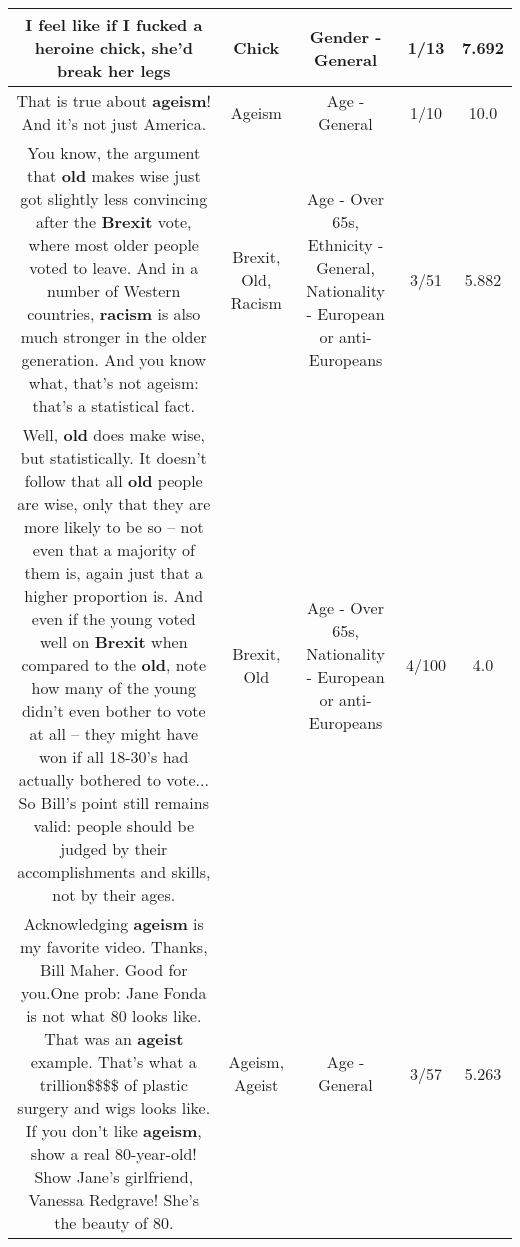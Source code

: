 \documentclass[11pt]{article}
\newlength\mylength
\begin{document}
\begin{center}
\begin{longtable}{|C{.65\mylength}|C{.30\mylength}|C{.12\mylength}|C{.12\mylength}|C{.12\mylength}|}
  \small I feel like if I fucked a heroine \textbf{chick},  she'd break her legs\normalsize   & Chick & Gender - General & 1/13 & 7.692 \\  \hline
  \small That is true about \textbf{ageism}! And it's not just America.\normalsize   & Ageism & Age - General & 1/10 & 10.0 \\  \hline
  \small You know, the argument that \textbf{old} makes wise just got slightly less convincing after the \textbf{Brexit} vote, where most older people voted to leave. And in a number of Western countries, \textbf{racism} is also much stronger in the older generation. And you know what, that's not ageism: that's a statistical fact.\normalsize   & Brexit, Old, Racism & Age - Over 65s, Ethnicity - General, Nationality - European or anti-Europeans & 3/51 & 5.882 \\  \hline
  \small Well, \textbf{old} does make wise, but statistically. It doesn't follow that all \textbf{old} people are wise, only that they are more likely to be so -- not even that a majority of them is, again just that a higher proportion is. And even if the young voted well on \textbf{Brexit} when compared to the \textbf{old}, note how many of the young didn't even bother to vote at all -- they might have won if all 18-30's had actually bothered to vote...  So Bill's point still remains valid: people should be judged by their accomplishments and skills, not by their ages.\normalsize   & Brexit, Old & Age - Over 65s, Nationality - European or anti-Europeans & 4/100 & 4.0 \\  \hline
  \small Acknowledging \textbf{ageism} is my favorite video. Thanks, Bill Maher. Good for you.One prob: Jane Fonda is not what 80 looks like. That was an \textbf{ageist} example. That's what a trillion\$\$\$\$ of plastic surgery and wigs looks like. If you don't like \textbf{ageism}, show a real 80-year-old! Show Jane's girlfriend, Vanessa Redgrave! She's the beauty of 80.\normalsize   & Ageism, Ageist & Age - General & 3/57 & 5.263 \\  \hline

\end{longtable}
\end{center}
\end{document}
